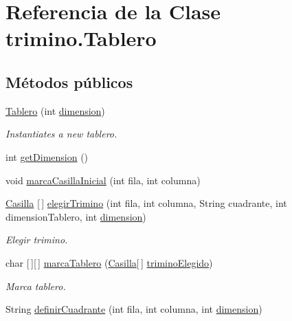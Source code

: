\hypertarget{classtrimino_1_1Tablero}{}\section{Referencia de la Clase trimino.\+Tablero}
\label{classtrimino_1_1Tablero}
\subsection*{Métodos públicos}
\begin{DoxyCompactItemize}
\item 
\mbox{\hyperlink{classtrimino_1_1Tablero_a64fd87eb39c717e10f9c9bd854b817d3}{Tablero}} (int \mbox{\hyperlink{classtrimino_1_1Tablero_a99d732d6a9b3b2d75ed7bc5bbe6a22f7}{dimension}})
\begin{DoxyCompactList}\small\item\em Instantiates a new tablero. \end{DoxyCompactList}\item 
int \mbox{\hyperlink{classtrimino_1_1Tablero_a629206c5d1c37fb1de5c132b9e7b0f09}{get\+Dimension}} ()
\item 
void \mbox{\hyperlink{classtrimino_1_1Tablero_ae4bc58ebf11214c6e48b0ff7b64eb58e}{marca\+Casilla\+Inicial}} (int fila, int columna)
\item 
\mbox{\hyperlink{classtrimino_1_1Casilla}{Casilla}} \mbox{[}$\,$\mbox{]} \mbox{\hyperlink{classtrimino_1_1Tablero_aff4215587c5b1d20ca19f420d989a209}{elegir\+Trimino}} (int fila, int columna, String cuadrante, int dimension\+Tablero, int \mbox{\hyperlink{classtrimino_1_1Tablero_a99d732d6a9b3b2d75ed7bc5bbe6a22f7}{dimension}})
\begin{DoxyCompactList}\small\item\em Elegir trimino. \end{DoxyCompactList}\item 
char \mbox{[}$\,$\mbox{]}\mbox{[}$\,$\mbox{]} \mbox{\hyperlink{classtrimino_1_1Tablero_a03a6bb741611d91f2e5b65ffda02d0e2}{marca\+Tablero}} (\mbox{\hyperlink{classtrimino_1_1Casilla}{Casilla}}\mbox{[}$\,$\mbox{]} \mbox{\hyperlink{classtrimino_1_1Tablero_ae28469f3840e1b257a45e3002f04cd7a}{trimino\+Elegido}})
\begin{DoxyCompactList}\small\item\em Marca tablero. \end{DoxyCompactList}\item 
String \mbox{\hyperlink{classtrimino_1_1Tablero_a635b4034c7de88cf27048168ff6612d6}{definir\+Cuadrante}} (int fila, int columna, int \mbox{\hyperlink{classtrimino_1_1Tablero_a99d732d6a9b3b2d75ed7bc5bbe6a22f7}{dimension}})

\end{DoxyCompactItemize}
